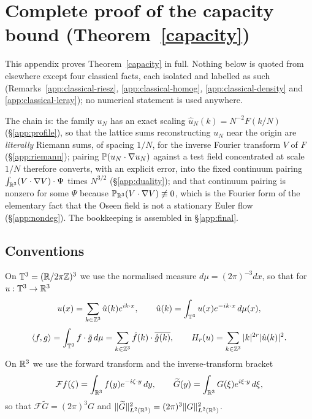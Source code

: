 
\section{Complete proof of the capacity bound (Theorem~\ref{capacity})}
\label{app:capacity}

This appendix proves Theorem~\ref{capacity} in full. Nothing below is
quoted from elsewhere except four classical facts, each isolated and
labelled as such (Remarks~\ref{app:classical-riesz},
\ref{app:classical-homog}, \ref{app:classical-density} and
\ref{app:classical-leray}); no numerical statement is used anywhere.

The chain is: the family $u_N$ has an exact scaling
$\hat u_N(k)=N^{-2}F(k/N)$ (\S\ref{app:profile}), so that the lattice
sums reconstructing $u_N$ near the origin are \emph{literally} Riemann
sums, of spacing $1/N$, for the inverse Fourier transform $V$ of $F$
(\S\ref{app:riemann}); pairing $\mathbb P(u_N\cdot\nabla u_N)$ against a test
field concentrated at scale $1/N$ therefore converts, with an explicit
error, into the fixed continuum pairing
$\int_{\mathbb R^3}(V\cdot\nabla V)\cdot\Psi$ times $N^{3/2}$
(\S\ref{app:duality}); and that continuum pairing is nonzero for some
$\Psi$ because $\mathbb P_{\mathbb R^3}(V\cdot\nabla V)\not\equiv0$, which is the
Fourier form of the elementary fact that the Oseen field is not a
stationary Euler flow (\S\ref{app:nondeg}). The bookkeeping is assembled
in \S\ref{app:final}.

\subsection{Conventions}
\label{app:conventions}

On $\mathbb T^3=(\mathbb R/2\pi\mathbb Z)^3$ we use the normalised measure
$d\mu=(2\pi)^{-3}dx$, so that for $u:\mathbb T^3\to\mathbb R^3$
\[
u(x)=\sum_{k\in\mathbb Z^3}\hat u(k)e^{ik\cdot x},\qquad
\hat u(k)=\int_{\mathbb T^3}u(x)e^{-ik\cdot x}\,d\mu(x),
\]
\[
\langle f,g\rangle=\int_{\mathbb T^3}f\cdot\bar g\,d\mu
=\sum_{k\in\mathbb Z^3}\hat f(k)\cdot\overline{\hat g(k)},
\qquad
H_r(u)=\sum_{k\in\mathbb Z^3}|k|^{2r}|\hat u(k)|^2 .
\]
On $\mathbb R^3$ we use the forward transform and the inverse-transform
bracket
\[
\mathcal F f(\zeta)=\int_{\mathbb R^3}f(y)e^{-i\zeta\cdot y}\,dy,
\qquad
\widetilde G(y)=\int_{\mathbb R^3}G(\xi)e^{i\xi\cdot y}\,d\xi ,
\]
so that $\mathcal F\widetilde G=(2\pi)^3G$ and
$\|\widetilde G\|_{L^2(\mathbb R^3)}^2=(2\pi)^3\|G\|_{L^2(\mathbb R^3)}^2$.

